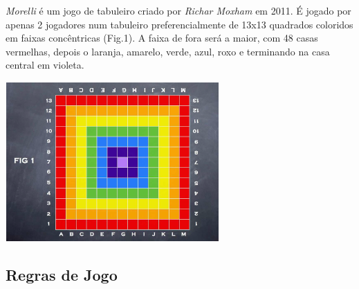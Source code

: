 \documentclass[a4paper]{article}
\begin{document}
\textit{Morelli} é um jogo de tabuleiro criado por \textit{Richar Moxham} em 2011. É jogado por apenas 2 jogadores num tabuleiro preferencialmente de 13x13 quadrados coloridos em faixas concêntricas (Fig.1). A faixa de fora será a maior, com 48 casas vermelhas, depois o laranja, amarelo, verde, azul, roxo e terminando na casa central em violeta. 


\begin{center}
\includegraphics[scale=0.9]{fig1.png}\linebreak\linebreak 
\end{center}


\newpage
\subsection{Regras de Jogo}
\end{document}
